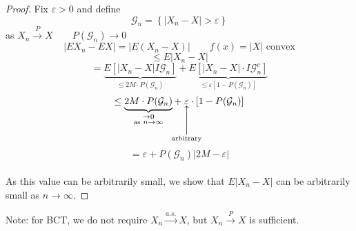\begin{proof}
    Fix $\varepsilon > 0$ and define
    \[\mathcal{G}_n = \left\{\left|X_n - X\right| > \varepsilon\right\}\]
    as $X_n \overset{P}{\to} X \qquad P(\mathcal{G}_n) \to 0$
    \[\left|EX_n - EX\right| = \left|E(X_n - X)\right| \qquad f(x) = \left|X\right| \text{ convex}\]
    \[\leq E\left|X_n - X\right|\]
    \[= \underbrace{E[\left|X_n - X\right|I\mathcal{G}_n]}_{\leq 2M\cdot P(\mathcal{G}_n)} + \underbrace{E[\left|X_n - X\right| \cdot I \mathcal{G}_n^c]}_{\leq \varepsilon [1-P(\mathcal{G}_n)]}\]
    \[\leq \underbrace{2M\cdot P(\mathcal{G}_n)}_{\substack{\to 0\\ \text{as } n\to\infty}} + \;\underset{\mathclap{\substack{\Bigg\uparrow\\ \text{arbitrary}}}}{\varepsilon}\cdot[1-P(\mathcal{G}_n)]\]
    \[= \varepsilon + P(\mathcal{G}_n)\left|2M - \varepsilon\right|\]
    \\As this value can be arbitrarily small, we show that $E\left|X_n - X\right|$ can be arbitrarily small as $n \to \infty$.
\end{proof}
Note: for BCT, we do not require $X_n \overset{a.s.}{\longrightarrow} X$, but $X_n \overset{P}{\longrightarrow} X$ is sufficient.

